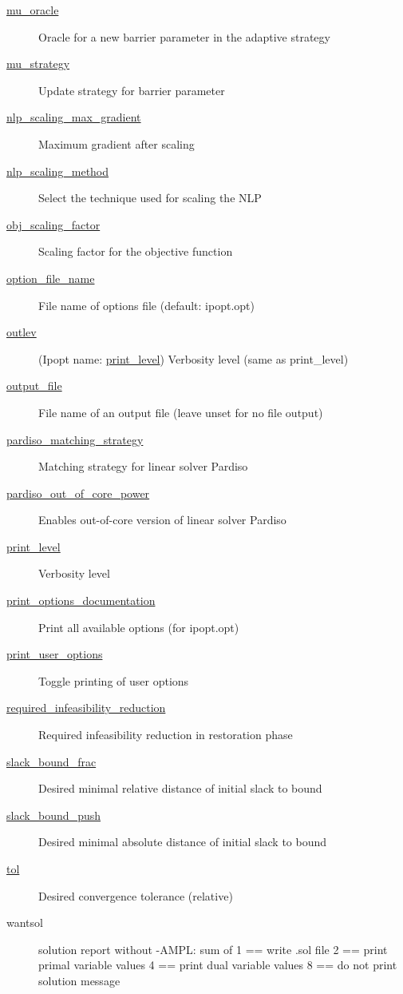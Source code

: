 \begin{description}
\item[{\hyperref[opt:mu_oracle]{mu\_oracle}}] Oracle for a new barrier parameter in the adaptive strategy
\item[{\hyperref[opt:mu_strategy]{mu\_strategy}}] Update strategy for barrier parameter
\item[{\hyperref[opt:nlp_scaling_max_gradient]{nlp\_scaling\_max\_gradient}}] Maximum gradient after scaling
\item[{\hyperref[opt:nlp_scaling_method]{nlp\_scaling\_method}}] Select the technique used for scaling the NLP
\item[{\hyperref[opt:obj_scaling_factor]{obj\_scaling\_factor}}] Scaling factor for the objective function
\item[{\hyperref[opt:option_file_name]{option\_file\_name}}] File name of options file (default: ipopt.opt)
\item[{\hyperref[opt:print_level]{outlev}}] (Ipopt name: \hyperref[opt:print_level]{print\_level}) Verbosity level (same as print\_level)
\item[{\hyperref[opt:output_file]{output\_file}}] File name of an output file (leave unset for no file output)
\item[{\hyperref[opt:pardiso_matching_strategy]{pardiso\_matching\_strategy}}] Matching strategy for linear solver Pardiso
\item[{\hyperref[opt:pardiso_out_of_core_power]{pardiso\_out\_of\_core\_power}}] Enables out-of-core version of linear solver Pardiso
\item[{\hyperref[opt:print_level]{print\_level}}] Verbosity level
\item[{\hyperref[opt:print_options_documentation]{print\_options\_documentation}}] Print all available options (for ipopt.opt)
\item[{\hyperref[opt:print_user_options]{print\_user\_options}}] Toggle printing of user options
\item[{\hyperref[opt:required_infeasibility_reduction]{required\_infeasibility\_reduction}}] Required infeasibility reduction in restoration phase
\item[{\hyperref[opt:slack_bound_frac]{slack\_bound\_frac}}] Desired minimal relative distance of initial slack to bound
\item[{\hyperref[opt:slack_bound_push]{slack\_bound\_push}}] Desired minimal absolute distance of initial slack to bound
\item[{\hyperref[opt:tol]{tol}}] Desired convergence tolerance (relative)
\item[wantsol] solution report without -AMPL: sum of 		1 == write .sol file 		2 == print primal variable values 		4 == print dual variable values 		8 == do not print solution message

\end{description}
